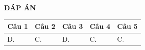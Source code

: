 \begin{center}
	\textbf{ĐÁP ÁN}
	\begin{longtable}[\textwidth]{|p{}|p{}|p{}|p{}|p{}|}
		\hline%
		\multicolumn{1}{|c}{\textbf{Câu 1}} & \multicolumn{1}{|c|}{\textbf{Câu 2}} & \multicolumn{1}{c|}{\textbf{Câu 3}} &
		\multicolumn{1}{c|}{\textbf{Câu 4}} &
		\multicolumn{1}{c|}{\textbf{Câu 5}} \\
		\hline
		D.&C. &D. &C. &C.	\\
		\hline

		
	\end{longtable}
	
\end{center}
